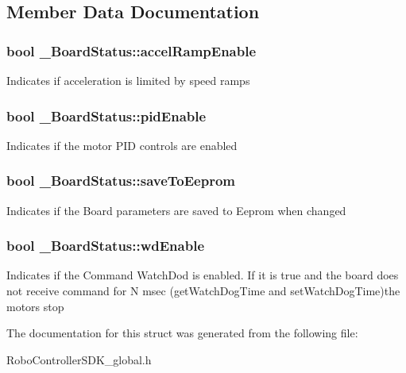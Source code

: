 \subsection{Member Data Documentation}
\hypertarget{struct___board_status_a950c73606e91c9302fde6d119f7e79a8}{
\subsubsection[{accel\-Ramp\-Enable}]{\setlength{\rightskip}{0pt plus 5cm}bool \-\_\-\-Board\-Status\-::accel\-Ramp\-Enable}}\label{struct___board_status_a950c73606e91c9302fde6d119f7e79a8}
Indicates if acceleration is limited by speed ramps \hypertarget{struct___board_status_ab46b9c91875df3c2871962e1b5d7ac59}{
\subsubsection[{pid\-Enable}]{\setlength{\rightskip}{0pt plus 5cm}bool \-\_\-\-Board\-Status\-::pid\-Enable}}\label{struct___board_status_ab46b9c91875df3c2871962e1b5d7ac59}
Indicates if the motor P\-I\-D controls are enabled \hypertarget{struct___board_status_a30b34c999564107e05997c953d0fc31c}{
\subsubsection[{save\-To\-Eeprom}]{\setlength{\rightskip}{0pt plus 5cm}bool \-\_\-\-Board\-Status\-::save\-To\-Eeprom}}\label{struct___board_status_a30b34c999564107e05997c953d0fc31c}
Indicates if the Board parameters are saved to Eeprom when changed \hypertarget{struct___board_status_aacf5e62d8821a7ee164979f9f529a867}{
\subsubsection[{wd\-Enable}]{\setlength{\rightskip}{0pt plus 5cm}bool \-\_\-\-Board\-Status\-::wd\-Enable}}\label{struct___board_status_aacf5e62d8821a7ee164979f9f529a867}
Indicates if the Command Watch\-Dod is enabled. If it is true and the board does not receive command for N msec (get\-Watch\-Dog\-Time and set\-Watch\-Dog\-Time)the motors stop 

The documentation for this struct was generated from the following file\-:\begin{DoxyCompactItemize}
\item 
Robo\-Controller\-S\-D\-K\-\_\-global.\-h\end{DoxyCompactItemize}
